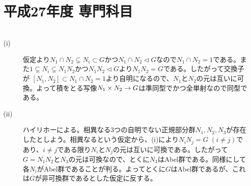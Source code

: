 \section{平成27年度 専門科目}

\subsubsection{}
\begin{sol} ${}$
  \begin{description}
    \item[(i)] 仮定より$N_1 \cap N_2 \subsetneq N_i \subset G$かつ$N_1 \cap N_2 \lhd G$なので$N_1 \cap N_2 = 1$である。また$1 \subsetneq N_i \subsetneq N_1 N_2 $かつ$N_1 N_2 \lhd G$より$N_1 N_2 = G$である。したがって交換子が
    $[N_1,N_2] \subset N_1 \cap N_2 = 1$より自明になるので、$N_1$と$N_2$の元は互いに可換。よって積をとる写像$N_1 \times N_2 \to G$は準同型でかつ全単射なので同型である。
    \item[(ii)] ハイリホーによる。相異なる$3$つの自明でない正規部分群$N_1, N_2, N_3$が存在したとしよう。相異なるという仮定から、(i)により$N_i N_j = G \; (i \neq j)$であり、$i \neq j$である限り$N_i$と$N_j$の元は互いに可換である。したがって$G = N_1 N_2$と$N_3$の元は可換なので、とくに$N_3$はAbel群である。同様にして各$N_i$がAbel群であることが判る。よってとくに$G$はAbel群であるが、これは$G$が非可換群であるとした仮定に反する。
\end{description}
\end{sol}


\newpage



